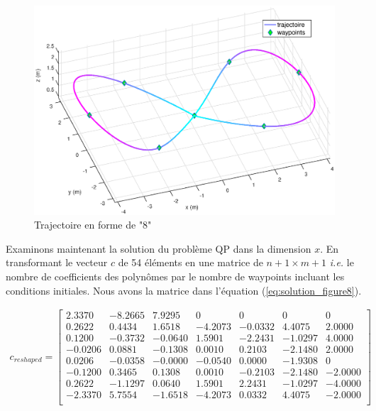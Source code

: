\begin{figure}[h!]
	\centering
	\includegraphics[width=0.8\linewidth]{fig/figure8}
	\caption{Trajectoire en forme de "8"}
	\label{fig:figure8}
\end{figure}

Examinons maintenant la solution du problème QP dans la dimension $x$. En transformant le vecteur $c$ de 54 éléments en une matrice de $n+1 \times m+1$ \textit{i.e.} le nombre de coefficients des polynômes par le nombre de waypoints incluant les conditions initiales. Nous avons la matrice dans l'équation (\ref{eq:solution_figure8}). 

\begin{align}\label{eq:solution_figure8}
c_{reshaped} = \begin{bmatrix}
  2.3370 &  -8.2665 &   7.9295 &        0 &        0 &        0 &        0  \\
  0.2622 &   0.4434 &   1.6518 &  -4.2073 &  -0.0332 &   4.4075 &   2.0000  \\
  0.1200 &  -0.3732 &  -0.0640 &   1.5901 &  -2.2431 &  -1.0297 &   4.0000  \\
  -0.0206 &   0.0881 &  -0.1308 &   0.0010 &   0.2103 &  -2.1480 &   2.0000 \\
  0.0206 &  -0.0358 &  -0.0000 &  -0.0540 &   0.0000 &  -1.9308 &        0  \\
  -0.1200 &   0.3465 &   0.1308 &   0.0010 &  -0.2103 &  -2.1480 &  -2.0000 \\
  0.2622 &  -1.1297 &   0.0640 &   1.5901 &   2.2431 &  -1.0297 &  -4.0000  \\
  -2.3370 &   5.7554 &  -1.6518 &  -4.2073 &   0.0332 &   4.4075 &  -2.0000 \\
\end{bmatrix}
\end{align}

